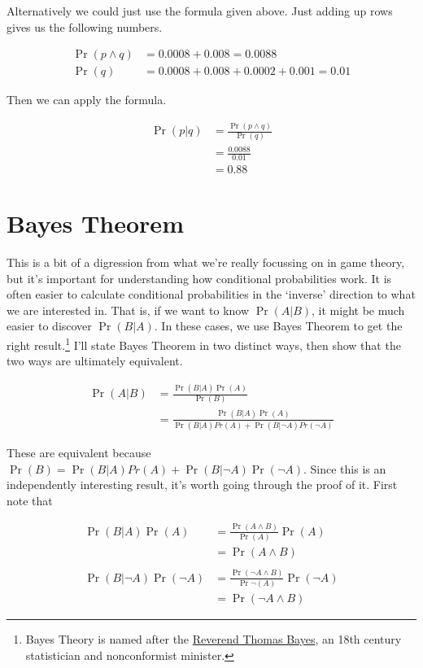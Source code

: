 \documentclass[
  11pt,
  letterpaper,
]{scrbook}
\begin{document}
Alternatively we could just use the formula given above. Just adding up
rows gives us the following numbers.

\begin{align*}
\Pr(p \wedge q) &= 0.0008 + 0.008 = 0.0088 \\
\Pr(q) &= 0.0008 + 0.008 + 0.0002 + 0.001 = 0.01
\end{align*}

Then we can apply the formula.

\begin{align*}
\Pr(p | q) &= \frac{\Pr(p \wedge q)}{\Pr(q)} \\
&= \frac{0.0088}{0.01} \\
&= 0.88
\end{align*}

\section{Bayes Theorem}\label{sec-bayes-theorem}

This is a bit of a digression from what we're really focussing on in
game theory, but it's important for understanding how conditional
probabilities work. It is often easier to calculate conditional
probabilities in the `inverse' direction to what we are interested in.
That is, if we want to know \(\Pr(A | B)\), it might be much easier to
discover \(\Pr(B | A)\). In these cases, we use Bayes Theorem to get the
right result.\footnote{Bayes Theory is named after the
  \href{https://en.wikipedia.org/wiki/Thomas_Bayes}{Reverend Thomas
  Bayes}, an 18th century statistician and nonconformist minister.} I'll
state Bayes Theorem in two distinct ways, then show that the two ways
are ultimately equivalent.

\begin{align*}
\Pr(A|B) &= \frac{\Pr(B|A) \Pr(A)}{\Pr(B)} \\
&= \frac{\Pr(B|A) \Pr(A)}{\Pr(B|A)Pr(A) + \Pr(B|\neg A)Pr(\neg A)}
\end{align*}

These are equivalent because
\(\Pr(B) = \Pr(B|A)Pr(A) + \Pr(B|\neg A)\Pr(\neg A)\). Since this is an
independently interesting result, it's worth going through the proof of
it. First note that

\begin{align*}
\Pr(B|A)\Pr(A) &= \frac{\Pr(A \wedge B)}{\Pr(A)} \Pr(A) \\
&= \Pr(A \wedge B) \\
\\
\Pr(B|\neg A)\Pr(\neg A) &= \frac{\Pr(\neg A \wedge B)}{\Pr\neg (A)} \Pr(\neg A) \\
&= \Pr(\neg A \wedge B)
\end{align*}
\end{document}
